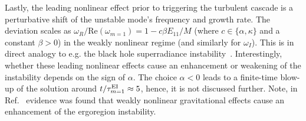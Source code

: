 \documentclass[aps,prl,notitlepage,superscriptaddress,twocolumn]{revtex4-1}
\begin{document}
Lastly, the leading nonlinear effect prior to triggering the turbulent cascade is a perturbative shift of the unstable mode's frequency and growth rate. The deviation scales as $\omega_{R}/\text{Re}(\omega_{m=1})=1-c\beta E_{11}/M$ (where $c\in\{\alpha,\kappa\}$ and a constant $\beta >0$) in the weakly nonlinear regime (and similarly for $\omega_I$). This is in direct analogy to e.g. the black hole superradiance instability~\cite{Baryakhtar:2017ngi,May:2024npn}. Interestingly, whether these leading nonlinear effects cause an enhancement or weakening of the instability depends on the sign of $\alpha$. The choice $\alpha<0$ leads to a finite-time blow-up of the solution around $t/\tau^{\rm EI}_{m=1}\approx 5$, hence, it is not discussed further. Note, in Ref.~\cite{Siemonsen:2025wib} evidence was found that weakly nonlinear gravitational effects cause an enhancement of the ergoregion instability.
\end{document}
